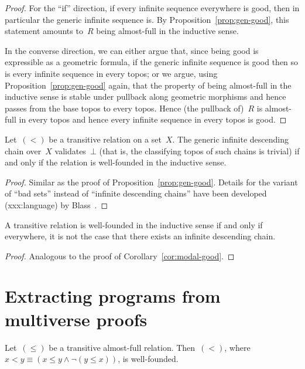\documentclass[envcountsect,envcountsame,runningheads]{llncs}
\renewcommand{\_}{\mathpunct{.}\,}
\newcommand{\?}{\,{:}\,}
\begin{document}
\begin{proof}For the ``if'' direction, if every infinite sequence everywhere is
good, then in particular the generic infinite sequence is. By
Proposition~\ref{prop:gen-good}, this statement amounts to~$R$ being
almost-full in the inductive sense.

In the converse direction, we can either argue that, since being good is
expressible as a geometric formula, if the generic infinite sequence is good
then so is every infinite sequence in every topos; or we argue, using
Proposition~\ref{prop:gen-good} again, that
the property of being almost-full in the inductive sense is stable
under pullback along geometric morphisms and hence passes from the base topos
to every topos. Hence (the pullback of)~$R$ is almost-full in every topos and
hence every infinite sequence in every topos is good.\end{proof}

\begin{proposition}Let~$({<})$ be a transitive relation on a set~$X$. The generic
infinite descending chain over~$X$ validates~$\bot$ (that is, the classifying
topos of such chains is trivial) if and only if the relation is well-founded in
the inductive sense.\end{proposition}

\begin{proof}Similar as the proof of Proposition~\ref{prop:gen-good}. Details
for the variant of ``bad sets'' instead of ``infinite descending chains'' have
been developed (xxx:language) by Blass~\cite{blass:induction}.\end{proof}

\begin{corollary}A transitive relation is well-founded in the inductive sense
if and only if everywhere, it is not the case that there exists an infinite
descending chain.\end{corollary}

\begin{proof}Analogous to the proof of
Corollary~\ref{cor:modal-good}.\end{proof}


\section{Extracting programs from multiverse proofs}
\label{sect:program-extraction}

\begin{proposition}\label{prop:af-wf}Let~$({\leq})$ be a transitive almost-full relation.
Then~$({<})$, where~$x < y \equiv (x \leq y \wedge \neg(y \leq x))$,
is well-founded.\end{proposition}
\end{document}

